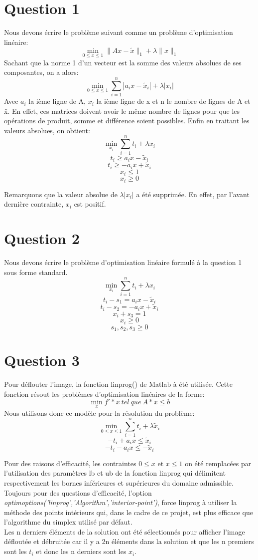 \documentclass[a4paper, 12pt]{article}
\begin{document}
\section{Question 1}
	Nous devons écrire le problème suivant comme un problème d’optimisation linéaire:
		\[
			\min_{0 \le x \le 1} \| Ax-\tilde{x} \|_1 + \lambda \| x \|_1
		\]
	Sachant que la norme 1 d'un vecteur est la somme des valeurs absolues de ses composantes, on a alors:
		\[
			\min_{0 \le x \le 1} \sum_{i=1}^n |a_i x-\tilde{x}_i | + \lambda |x_i|
		\]
	Avec $a_i$ la ième ligne de A, $x_i$ la ième ligne de x et n le nombre de lignes de A et \~x. En effet, ces matrices doivent avoir le même nombre de lignes pour que les opérations de produit, somme et différence soient possibles.
	Enfin en traitant les valeurs absolues, on obtient:
	\[
		\min_{x_i} \sum_{i=1}^n t_i + \lambda x_i
	\]
	\[
		t_i \ge a_i x-\tilde{x}_i
	\]
	\[
		t_i \ge -a_i x+\tilde{x}_i
	\]
	\[
		x_i \le 1
	\]
	\[
		x_i \ge 0
	\]

	Remarquons que la valeur absolue de $\lambda |x_i|$ a été supprimée. En effet, par l'avant dernière contrainte, $x_i$ est positif.
\newpage
\section{Question 2}
	Nous devons écrire le problème d'optimisation linéaire formulé à la question 1 sous forme standard. 
	\[
		\min_{x_i} \sum_{i=1}^n t_i + \lambda x_i
	\]
	\[
		t_i -s_1= a_i x-\tilde{x}_i
	\]
	\[
		t_i -s_2= -a_i x+\tilde{x}_i
	\]
	\[
		x_i + s_3 = 1
	\]
	\[
		x_i \ge 0
	\]
	\[
		s_1, s_2, s_3 \ge 0
	\]

\section{Question 3}
	Pour déflouter l'image, la fonction linprog() de Matlab à été utilisée. Cette fonction résout les problèmes d'optimisation linéaires de la forme: 
	\[
		\min_{x} f' *x\ tel\ que\ A*x \le b
	\]
	Nous utilisons donc ce modèle pour la résolution du problème:
	\[
		\min_{0 \le x \le 1} \sum_{i=1}^n t_i + \lambda \tilde{x}_i
	\]
	\[
		-t_i+a_i x \le \tilde{x}_i
	\]
	\[
		-t_i-a_i x \le - \tilde{x}_i
	\]

	Pour des raisons d'efficacité, les contraintes $0 \le x$ et $x\le 1$ on été remplacées par l'utilisation des paramètres lb et ub de la fonction linprog qui délimitent respectivement les bornes inférieures et supérieures du domaine admissible. Toujours pour des questions d'efficacité, l'option\\ \textit{optimoptions('linprog','Algorithm','interior-point')}, force linprog à utiliser la méthode des points intérieurs qui, dans le cadre de ce projet, est plus efficace que l'algorithme du simplex utilisé par défaut. \\
	Les n derniers éléments de la solution ont été sélectionnés pour afficher l'image défloutée et débruitée car il y a 2n éléments dans la solution et que les n premiers sont les $t_i$ et donc les n derniers sont les $x_i$.
\end{document}
